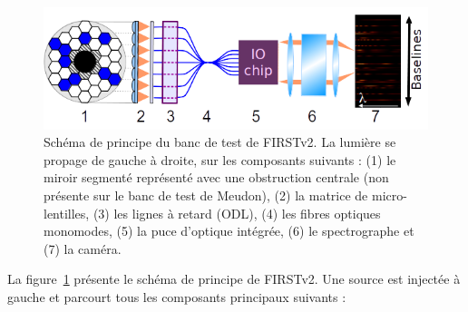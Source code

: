 \begin{figure}[ht!]
    \centering
    \includegraphics[width=\figwidth]{Figure_Chap2/FIRSTv2Scheme_20Outputs_Fringes_b.png}
    \caption[Schéma de principe du banc de test de FIRSTv2.]{Schéma de principe du banc de test de FIRSTv2. La lumière se propage de gauche à droite, sur les composants suivants : (1) le miroir segmenté représenté avec une obstruction centrale (non présente sur le banc de test de Meudon), (2) la matrice de micro-lentilles, (3) les lignes à retard (ODL), (4) les fibres optiques monomodes, (5) la puce d'optique intégrée, (6) le spectrographe et (7) la caméra.}
    \label{fig:FIRSTv2Scheme}
\end{figure}

La figure~\ref{fig:FIRSTv2Scheme} présente le schéma de principe de \ac{FIRSTv2}. Une source est injectée à gauche et parcourt tous les composants principaux suivants :

